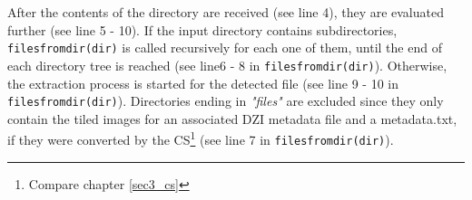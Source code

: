 After the contents of the directory are received (see line 4), they are evaluated further (see line 5 - 10). If the input directory contains subdirectories, \texttt{files{\textunderscore}from{\textunderscore}dir(dir)} is called recursively for each one of them, until the end of each directory tree is reached (see line6 - 8 in \texttt{files{\textunderscore}from{\textunderscore}dir(dir)}). Otherwise, the extraction process is started for the detected file (see line 9 - 10 in \texttt{files{\textunderscore}from{\textunderscore}dir(dir)}). Directories ending in \emph{"{\textunderscore}files"} are excluded since they only contain the tiled images for an associated DZI metadata file and a metadata.txt, if they were converted by the CS\footnote{
	Compare chapter \ref{sec3_cs}
} (see line 7 in \texttt{files{\textunderscore}from{\textunderscore}dir(dir)}).